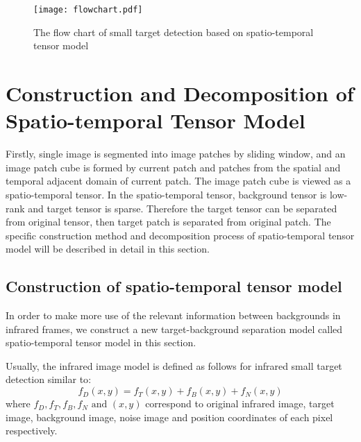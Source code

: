\documentclass[journal]{IEEEtran}
\begin{document}
\begin{figure}[htb]
  \centering
  \texttt{[image: flowchart.pdf]}
  \caption{The flow chart of small target detection based on spatio-temporal tensor model}
  \label{fig:flow_chart}
\end{figure}


\section{Construction and Decomposition of Spatio-temporal Tensor Model}
Firstly, single image is segmented into image patches by sliding window, and an image patch cube is formed by current patch and patches from the spatial and temporal adjacent domain of current patch. The image patch cube is viewed as a spatio-temporal tensor. In the spatio-temporal tensor, background tensor is low-rank and target tensor is sparse. Therefore the target tensor can be separated from original tensor, then target patch is separated from original patch. The specific construction method and decomposition process of spatio-temporal tensor model will be described in detail in this section.


\subsection{Construction of spatio-temporal tensor model}
In order to make more use of the relevant information between backgrounds in infrared frames, we construct a new target-background separation model called spatio-temporal tensor model in this section. 

Usually, the infrared image model is defined as follows for infrared small target detection similar to\cite{gu2010kernel}:
\begin{equation}
  f_D(x,y)=f_T(x,y)+f_B(x,y)+f_N(x,y)
  \label{eq:image_model}
\end{equation}
where $f_D,f_T,f_B,f_N \text{ and } (x,y)$ correspond to original infrared image, target image, background image, noise image and position coordinates of each pixel respectively.
\end{document}
